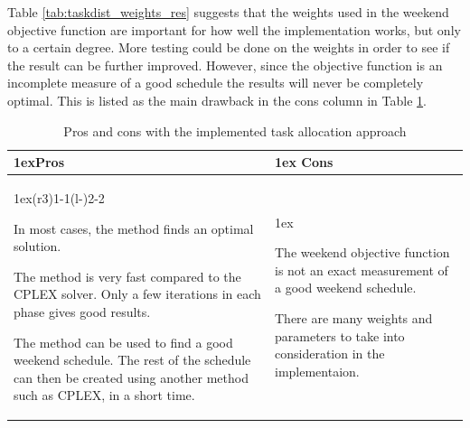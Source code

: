 Table \ref{tab:taskdist_weights_res} suggests that the weights used in the weekend objective function are important for how well the implementation works, but only to a certain degree. More testing could be done on the weights in order to see if the result can be further improved. However, since the objective function is an incomplete measure of a good schedule the results will never be completely optimal. This is listed as the main drawback in the cons column in Table \ref{tab:pros_cons_task_scheduling}. 

\begin{table}[!ht]
\caption{Pros and cons with the implemented task allocation approach}
\label{tab:pros_cons_task_scheduling}
\begin{tabularx}{\linewidth}{>{\parskip1ex}X@{\kern4\tabcolsep}>{\parskip1ex}X}
\toprule
\hfil\bfseries Pros
&
\hfil\bfseries Cons
\\\cmidrule(r{3\tabcolsep}){1-1}\cmidrule(l{-\tabcolsep}){2-2}

In most cases, the method finds an optimal solution. \par
The method is very fast compared to the CPLEX solver. Only a few iterations in each phase gives good results. \par
The method can be used to find a good weekend schedule. The rest of the schedule can then be created using another method such as CPLEX, in a short time. \par

&

The weekend objective function is not an exact measurement of a good weekend schedule. \par
There are many weights and parameters to take into consideration in the implementaion. \par


\\\bottomrule
\end{tabularx}
\end{table}

